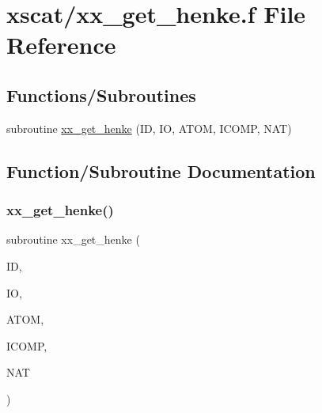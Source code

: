 \hypertarget{xx__get__henke_8f}{}\section{xscat/xx\+\_\+get\+\_\+henke.f File Reference}
\label{xx__get__henke_8f}
\subsection*{Functions/\+Subroutines}
\begin{DoxyCompactItemize}
\item 
subroutine \hyperlink{xx__get__henke_8f_ad4c24987d890068ec4ef2fa6020a0043}{xx\+\_\+get\+\_\+henke} (ID, IO, A\+T\+OM, I\+C\+O\+MP, N\+AT)
\end{DoxyCompactItemize}


\subsection{Function/\+Subroutine Documentation}
\mbox{\label{xx__get__henke_8f_ad4c24987d890068ec4ef2fa6020a0043}} 
\subsubsection{\texorpdfstring{xx\+\_\+get\+\_\+henke()}{xx\_get\_henke()}}
{\footnotesize\ttfamily subroutine xx\+\_\+get\+\_\+henke (\begin{DoxyParamCaption}\item[{integer}]{ID,  }\item[{integer}]{IO,  }\item[{character, dimension(nat)}]{A\+T\+OM,  }\item[{integer, dimension(nat)}]{I\+C\+O\+MP,  }\item[{integer}]{N\+AT }\end{DoxyParamCaption})}

